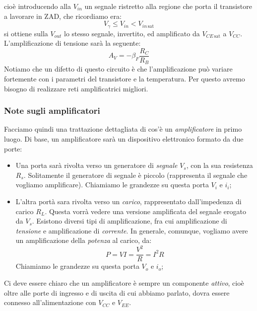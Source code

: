 \documentclass[a4paper,11pt]{article}
\begin{document}
cioè introducendo alla $V_{in}$ un segnale ristretto alla regione che porta il transistore a lavorare in ZAD, che ricordiamo era:
$$
V_\gamma \leq V_{in} < V_{in \, \mathrm{sat}}
$$
si ottiene sulla $V_{out}$ lo stesso segnale, invertito, ed amplificato da $V_{CE \, \mathrm{sat}}$ a $V_{CC}$.
L'amplificazione di tensione sarà la seguente:
$$
A_V = - \beta_F \frac{R_C}{R_B}
$$
Notiamo che un difetto di questo circuito è che l’amplificazione può variare fortemente con i parametri del transistore e la temperatura. Per questo avremo bisogno di realizzare reti amplificatrici migliori.

\subsubsection{Note sugli amplificatori}
Facciamo quindi una trattazione dettagliata di cos'è un \textit{amplificatore} in primo luogo. Di base, un amplificatore sarà un dispositivo elettronico formato da due porte:
\begin{itemize}
	\item Una porta sarà rivolta verso un generatore di \textit{segnale} $V_s$, con la sua resistenza $R_s$. Solitamente il generatore di segnale è piccolo (rappresenta il segnale che vogliamo amplificare). Chiamiamo le grandezze su questa porta $V_i$ e $i_i$;
	\item L'altra portà sara rivolta verso un \textit{carico}, rappresentato dall'impedenza di carico $R_L$. Questa vorrà vedere una versione amplificata del segnale erogato da $V_s$. Esistono diversi tipi di amplificazione, fra cui amplificazione di \textit{tensione} e amplificazione di \textit{corrente}. In generale, comunque, vogliamo avere un amplificazione della \textit{potenza} al carico, da:
$$
P = VI = \frac{V^2}{R} = I^2 R
$$
Chiamiamo le grandezze su questa porta $V_o$ e $i_o$;
\end{itemize}

Ci deve essere chiaro che un amplificatore è sempre un componente \textit{attivo}, cioè oltre alle porte di ingresso e di uscita di cui abbiamo parlato, dovra essere connesso all'alimentazione con $V_{CC}$ e $V_{EE}$. 
\end{document}
